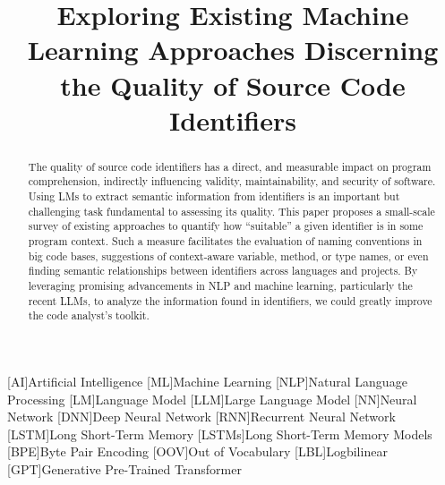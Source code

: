 \documentclass[conference]{IEEEtran}
\begin{document}

[AI]{Artificial Intelligence}
[ML]{Machine Learning}
[NLP]{Natural Language Processing}
[LM]{Language Model}
[LLM]{Large Language Model}
[NN]{Neural Network}
[DNN]{Deep Neural Network}
[RNN]{Recurrent Neural Network}
[LSTM]{Long Short-Term Memory}
[LSTMs]{Long Short-Term Memory Models}
[BPE]{Byte Pair Encoding}
[OOV]{Out of Vocabulary}
[LBL]{Logbilinear}
[GPT]{Generative Pre-Trained Transformer}

\title{Exploring Existing Machine Learning Approaches Discerning the Quality of Source
Code Identifiers}

\author{
\and
{}
}

\maketitle

\begin{abstract}

    The quality of source code identifiers has a direct, and measurable impact on program
    comprehension, indirectly influencing validity, maintainability, and security of
    software. Using \acp{LM} to extract semantic information from identifiers is an
    important but challenging task fundamental to assessing its quality. This paper
    proposes a small-scale survey of existing approaches to quantify how ``suitable'' a
    given identifier is in some program context. Such a measure facilitates the evaluation
    of naming conventions in big code bases, suggestions of context-aware variable,
    method, or type names, or even finding semantic relationships between identifiers
    across languages and projects. By leveraging promising advancements in \ac{NLP} and
    machine learning, particularly the recent \acp{LLM}, to analyze the information found
    in identifiers, we could greatly improve the code analyst's toolkit.

\end{abstract}
\acresetall
\end{document}

